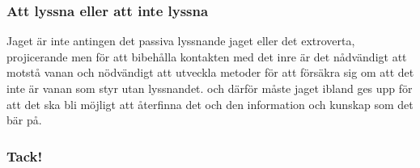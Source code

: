 \documentclass[ignorenonframetext]{beamer}
\begin{document}
  \begin{frame}
    \frametitle{Att lyssna eller att inte lyssna}
    
    Jaget är inte antingen det passiva lyssnande jaget eller det extroverta, projicerande men för att bibehålla kontakten med det inre är det nådvändigt att motstå vanan och nödvändigt att utveckla metoder för att försäkra sig om att det inte är vanan som styr utan lyssnandet. och därför måste jaget ibland ges upp för att det ska bli möjligt att återfinna det och den information och kunskap som det bär på.

  \end{frame}

  \begin{frame}
    \frametitle{Tack!}
    
  \end{frame}
\end{document}
